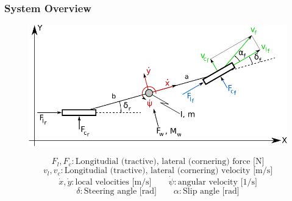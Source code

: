 \documentclass{beamer}
\begin{document}
\begin{frame}
\frametitle{System Overview}

\begin{figure} [h]
\begin{center}
\includegraphics[scale=0.8]{images/dynamics_overview.pdf}
\label{fig:system_dynamics}
\end{center}
\end{figure}
\[F_l, F_c : \text{Longitudial (tractive), lateral (cornering) force [N]}\]
\[v_l, v_c : \text{Longitudial (tractive), lateral (cornering) velocity [m/s]}\]
\[\dot{x}, \dot{y} : \text{local velocities [m/s]} \qquad \dot{\psi} :
\text{angular velocity [1/s]}\]
\[\delta : \text{Steering angle [rad]} \qquad \alpha : \text{Slip angle [rad]}\]

\end{frame}
\end{document}
